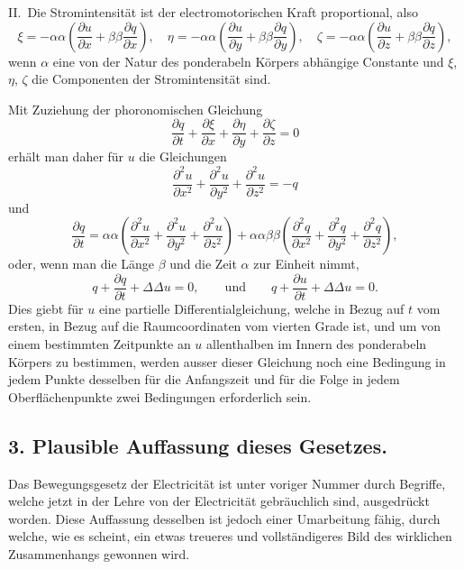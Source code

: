 \documentclass[12pt,a4paper]{article}
\begin{document}
II.\ Die Stromintensit\"at ist der electromotorischen Kraft proportional, also
\[
\xi = -\alpha\alpha\left(\frac{\partial u}{\partial x} + \beta\beta\frac{\partial q}{\partial x}\right), \quad
\eta = -\alpha\alpha\left(\frac{\partial u}{\partial y} + \beta\beta\frac{\partial q}{\partial y}\right), \quad
\zeta = -\alpha\alpha\left(\frac{\partial u}{\partial z} + \beta\beta\frac{\partial q}{\partial z}\right),
\]
wenn $\alpha$ eine von der Natur des ponderabeln K\"orpers abh\"angige Constante und $\xi$, $\eta$, $\zeta$ die Componenten der Stromintensit\"at sind.

Mit Zuziehung der phoronomischen Gleichung
\[
\frac{\partial q}{\partial t} + \frac{\partial\xi}{\partial x} + \frac{\partial\eta}{\partial y} + \frac{\partial\zeta}{\partial z} = 0
\]
erh\"alt man daher f\"ur $u$ die Gleichungen
\[
\frac{\partial^2 u}{\partial x^2} + \frac{\partial^2 u}{\partial y^2} + \frac{\partial^2 u}{\partial z^2} = -q
\]
und
\[
\frac{\partial q}{\partial t} = \alpha\alpha\left(\frac{\partial^2 u}{\partial x^2} + \frac{\partial^2 u}{\partial y^2} + \frac{\partial^2 u}{\partial z^2}\right) + \alpha\alpha\beta\beta\left(\frac{\partial^2 q}{\partial x^2} + \frac{\partial^2 q}{\partial y^2} + \frac{\partial^2 q}{\partial z^2}\right),
\]
oder, wenn man die L\"ange $\beta$ und die Zeit $\alpha$ zur Einheit nimmt,
\[
q + \frac{\partial q}{\partial t} + \Delta\Delta u = 0, \qquad \text{und} \qquad q + \frac{\partial u}{\partial t} + \Delta\Delta u = 0.
\]
Dies giebt f\"ur $u$ eine partielle Differentialgleichung, welche in Bezug auf $t$ vom ersten, in Bezug auf die Raumcoordinaten vom vierten Grade ist, und um von einem bestimmten Zeitpunkte an $u$ allenthalben im Innern des ponderabeln K\"orpers zu bestimmen, werden ausser dieser Gleichung noch eine Bedingung in jedem Punkte desselben f\"ur die Anfangszeit und f\"ur die Folge in jedem Oberfl\"achenpunkte zwei Bedingungen erforderlich sein.

\subsection*{3. Plausible Auffassung dieses Gesetzes.}

Das Bewegungsgesetz der Electricit\"at ist unter voriger Nummer durch Begriffe, welche jetzt in der Lehre von der Electricit\"at gebr\"auchlich sind, ausgedr\"uckt worden. Diese Auffassung desselben ist jedoch einer Umarbeitung f\"ahig, durch welche, wie es scheint, ein etwas treueres und vollst\"andigeres Bild des wirklichen Zusammenhangs gewonnen wird.
\end{document}
